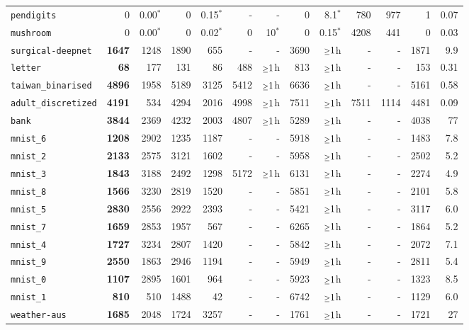 \begin{tabular}{lrrrrrrrrrrrr}
\texttt{pendigits} & 0 & 0.00$^*$ & 0 & 0.15$^*$ & - & - & 0 & 8.1$^*$ & 780 & 977 & 1 & 0.07\\
\texttt{mushroom} & 0 & 0.00$^*$ & 0 & 0.02$^*$ & 0 & 10$^*$ & 0 & 0.15$^*$ & 4208 & 441 & 0 & 0.03\\
\texttt{surgical-deepnet} & \textbf{1647} & 1248 & 1890 & 655 & - & - & 3690 & $\mathsmaller{\geq}1$h & - & - & 1871 & 9.9\\
\texttt{letter} & \textbf{68} & 177 & 131 & 86 & 488 & $\mathsmaller{\geq}1$h & 813 & $\mathsmaller{\geq}1$h & - & - & 153 & 0.31\\
\texttt{taiwan\_binarised} & \textbf{4896} & 1958 & 5189 & 3125 & 5412 & $\mathsmaller{\geq}1$h & 6636 & $\mathsmaller{\geq}1$h & - & - & 5161 & 0.58\\
\texttt{adult\_discretized} & \textbf{4191} & 534 & 4294 & 2016 & 4998 & $\mathsmaller{\geq}1$h & 7511 & $\mathsmaller{\geq}1$h & 7511 & 1114 & 4481 & 0.09\\
\texttt{bank} & \textbf{3844} & 2369 & 4232 & 2003 & 4807 & $\mathsmaller{\geq}1$h & 5289 & $\mathsmaller{\geq}1$h & - & - & 4038 & 77\\
\texttt{mnist\_6} & \textbf{1208} & 2902 & 1235 & 1187 & - & - & 5918 & $\mathsmaller{\geq}1$h & - & - & 1483 & 7.8\\
\texttt{mnist\_2} & \textbf{2133} & 2575 & 3121 & 1602 & - & - & 5958 & $\mathsmaller{\geq}1$h & - & - & 2502 & 5.2\\
\texttt{mnist\_3} & \textbf{1843} & 3188 & 2492 & 1298 & 5172 & $\mathsmaller{\geq}1$h & 6131 & $\mathsmaller{\geq}1$h & - & - & 2274 & 4.9\\
\texttt{mnist\_8} & \textbf{1566} & 3230 & 2819 & 1520 & - & - & 5851 & $\mathsmaller{\geq}1$h & - & - & 2101 & 5.8\\
\texttt{mnist\_5} & \textbf{2830} & 2556 & 2922 & 2393 & - & - & 5421 & $\mathsmaller{\geq}1$h & - & - & 3117 & 6.0\\
\texttt{mnist\_7} & \textbf{1659} & 2853 & 1957 & 567 & - & - & 6265 & $\mathsmaller{\geq}1$h & - & - & 1864 & 5.2\\
\texttt{mnist\_4} & \textbf{1727} & 3234 & 2807 & 1420 & - & - & 5842 & $\mathsmaller{\geq}1$h & - & - & 2072 & 7.1\\
\texttt{mnist\_9} & \textbf{2550} & 1863 & 2946 & 1194 & - & - & 5949 & $\mathsmaller{\geq}1$h & - & - & 2811 & 5.4\\
\texttt{mnist\_0} & \textbf{1107} & 2895 & 1601 & 964 & - & - & 5923 & $\mathsmaller{\geq}1$h & - & - & 1323 & 8.5\\
\texttt{mnist\_1} & \textbf{810} & 510 & 1488 & 42 & - & - & 6742 & $\mathsmaller{\geq}1$h & - & - & 1129 & 6.0\\
\texttt{weather-aus} & \textbf{1685} & 2048 & 1724 & 3257 & - & - & 1761 & $\mathsmaller{\geq}1$h & - & - & 1721 & 27\\
\bottomrule
\end{tabular}
